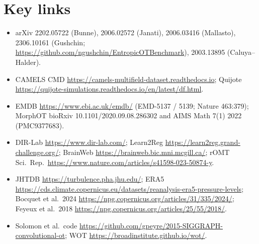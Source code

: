 \documentclass[11pt]{article}
\begin{document}
\section*{Key links}
\begin{itemize}
  \item arXiv 2202.05722 (Bunne), 2006.02572 (Janati), 2006.03416 (Mallasto),
        2306.10161 (Gushchin; \url{https://github.com/ngushchin/EntropicOTBenchmark}),
        2003.13895 (Caluya--Halder).
  \item CAMELS CMD \url{https://camels-multifield-dataset.readthedocs.io};
        Quijote \url{https://quijote-simulations.readthedocs.io/en/latest/df.html}.
  \item EMDB \url{https://www.ebi.ac.uk/emdb/} (EMD-5137 / 5139; Nature 463:379);
        MorphOT bioRxiv 10.1101/2020.09.08.286302 and AIMS Math 7(1) 2022 (PMC9377683).
  \item DIR-Lab \url{https://www.dir-lab.com/}; Learn2Reg
        \url{https://learn2reg.grand-challenge.org/}; BrainWeb
        \url{https://brainweb.bic.mni.mcgill.ca/}; rOMT Sci.\ Rep.\
        \url{https://www.nature.com/articles/s41598-023-50874-y}.
  \item JHTDB \url{https://turbulence.pha.jhu.edu/}; ERA5
        \url{https://cds.climate.copernicus.eu/datasets/reanalysis-era5-pressure-levels};
        Bocquet et al.\ 2024 \url{https://npg.copernicus.org/articles/31/335/2024/};
        Feyeux et al.\ 2018 \url{https://npg.copernicus.org/articles/25/55/2018/}.
  \item Solomon et al.\ code \url{https://github.com/gpeyre/2015-SIGGRAPH-convolutional-ot};
        WOT \url{https://broadinstitute.github.io/wot/}.
\end{itemize}
\end{document}
